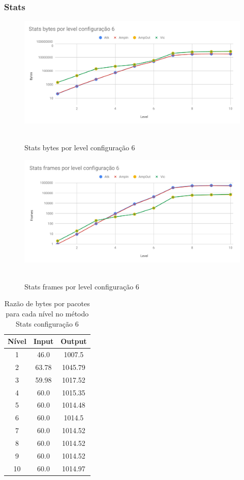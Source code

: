 \subsubsection{Stats}

\begin{figure}[H]
     \centering
     \label{graf:StatsBytes6}
     \includegraphics[scale=0.6]{img/capturas/StatsBLC6.pdf}\
     \caption{Stats bytes por level configuração 6}
\end{figure}

\begin{figure}[H]
     \centering
     \label{graf:StatsFrames6}
     \includegraphics[scale=0.6]{img/capturas/StatsFLC6.pdf}\
     \caption{Stats frames por level configuração 6}
\end{figure}

\begin{table}[H]
\centering
\label{tab:bytespacsStats6}
\caption{Razão de bytes por pacotes para cada nível no método Stats configuração 6}
\begin{tabular}{|c|c|c|}
\hline
Nível & Input & Output  \\ \hline
1     & 46.0  & 1007.5  \\ \hline
2     & 63.78 & 1045.79 \\ \hline
3     & 59.98 & 1017.52 \\ \hline
4     & 60.0  & 1015.35 \\ \hline
5     & 60.0  & 1014.48 \\ \hline
6     & 60.0  & 1014.5  \\ \hline
7     & 60.0  & 1014.52 \\ \hline
8     & 60.0  & 1014.52 \\ \hline
9     & 60.0  & 1014.52 \\ \hline
10    & 60.0  & 1014.97 \\ \hline
\end{tabular}
\end{table}


